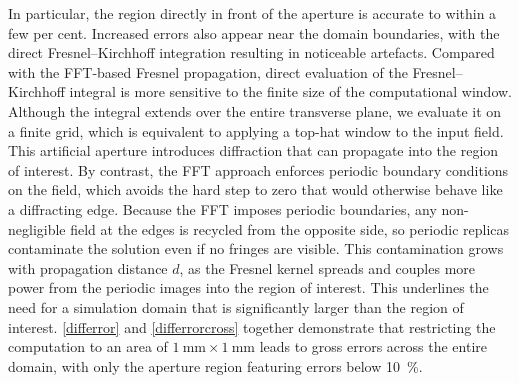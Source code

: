 \documentclass[../Thesis-IJspeert.tex]{subfiles}
\begin{document}
In particular, the region directly in front of the aperture is accurate to within a few per cent. Increased errors also appear near the domain boundaries, with the direct Fresnel--Kirchhoff integration resulting in noticeable artefacts. Compared with the FFT-based Fresnel propagation, direct evaluation of the Fresnel--Kirchhoff integral is more sensitive to the finite size of the computational window. Although the integral extends over the entire transverse plane, we evaluate it on a finite grid, which is equivalent to applying a top-hat window to the input field. This artificial aperture introduces diffraction that can propagate into the region of interest. By contrast, the FFT approach enforces periodic boundary conditions on the field, which avoids the hard step to zero that would otherwise behave like a diffracting edge. Because the FFT imposes periodic boundaries, any non-negligible field at the edges is recycled from the opposite side, so periodic replicas contaminate the solution even if no fringes are visible. This contamination grows with propagation distance $d$, as the Fresnel kernel spreads and couples more power from the periodic images into the region of interest. This underlines the need for a simulation domain that is significantly larger than the region of interest. \autoref{differror} and \autoref{differrorcross} together demonstrate that restricting the computation to an area of $\SI{1}{\milli\metre}\times\SI{1}{\milli\metre}$ leads to gross errors across the entire domain, with only the aperture region featuring errors below \SI{10}{\percent}.
\end{document}
